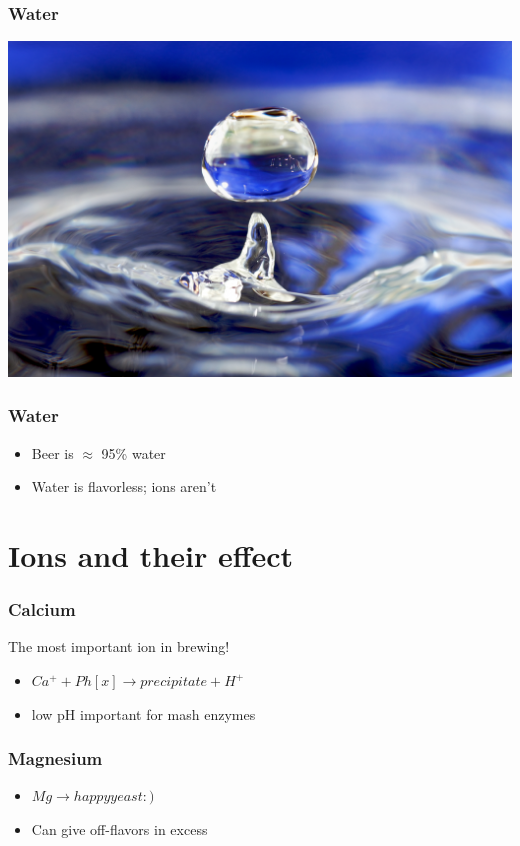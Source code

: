 \documentclass{beamer}
\begin{document}
\begin{frame}\frametitle{Water}
\begin{center}
\includegraphics[width=.8\linewidth]{./brewing/water/Water_drop_001.jpg}
\end{center}
\end{frame}

\begin{frame}\frametitle{Water}
  \begin{itemize}
  \item Beer is $\approx$ 95\% water
    \item Water is flavorless; ions aren't
    \end{itemize}
\end{frame}


\section{Ions and their effect}

\begin{frame}\frametitle{Calcium}
    The most important ion in brewing!
    \begin{itemize}
    \item $ Ca^{+} + Ph[x] \rightarrow precipitate + H^{+} $
      \item low pH important for mash enzymes
      \end{itemize}
\end{frame}

\begin{frame}\frametitle{Magnesium}
  \begin{itemize}
  \item $ Mg \rightarrow happy yeast :) $
  \item Can give off-flavors in excess
  \end{itemize}
\end{frame}
\end{document}
